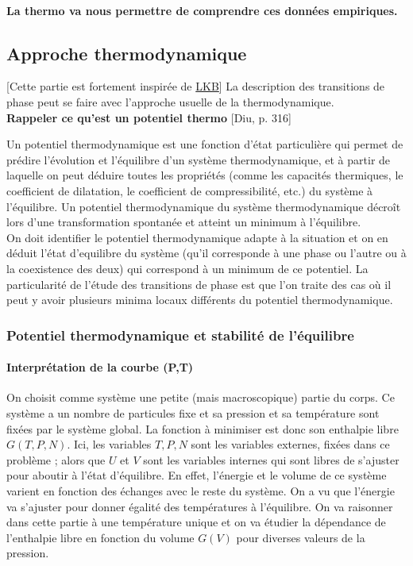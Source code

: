 \documentclass[11pt]{report}
\numberwithin{figure}{section}
\numberwithin{equation}{section}
\numberwithin{table}{section}
\newcommand{\1}{\boldsymbol{1}}
\begin{document}
\paragraph{La thermo va nous permettre de comprendre ces données empiriques.}


\subsection{Approche thermodynamique}


[Cette partie est fortement inspirée de \href{https://www.lkb.upmc.fr/boseeinsteincondensates/wp-content/uploads/sites/10/2017/10/CoursThermo2017.pdf}{LKB}] La description des transitions de phase peut se faire avec l’approche usuelle
de la thermodynamique. \\

\textbf{Rappeler ce qu'est un potentiel thermo} [Diu, p. 316]


Un potentiel thermodynamique est une fonction d'état particulière qui permet de prédire l'évolution et l'équilibre d'un système thermodynamique, et à partir de laquelle on peut déduire toutes les propriétés (comme les capacités thermiques, le coefficient de dilatation, le coefficient de compressibilité, etc.) du système à l'équilibre. Un potentiel thermodynamique du système thermodynamique décroît lors d'une transformation spontanée et atteint un minimum à l'équilibre. \\

On doit identifier le potentiel thermodynamique adapte à la situation et on en déduit l’état d’equilibre du système (qu’il corresponde à une phase ou l’autre ou à la coexistence des deux) qui correspond à un minimum de ce potentiel. La particularité de l’étude des transitions de phase est que l’on traite des cas où il peut y avoir plusieurs minima locaux différents du potentiel thermodynamique.

\subsubsection{Potentiel thermodynamique et stabilité de l'équilibre}

\paragraph{Interprétation de la courbe (P,T)}

On choisit comme système une petite (mais macroscopique) partie du corps.
Ce système a un nombre de particules fixe et sa pression et sa température sont
fixées par le système global. La fonction à minimiser est donc son enthalpie libre
$G(T,P,N)$. Ici, les variables $T, P, N$ sont les variables externes, fixées
dans ce problème ; alors que $U$ et $V$ sont les variables internes qui sont libres
de s’ajuster pour aboutir à l’état d’équilibre. En effet, l’énergie et le volume de ce système varient en fonction des échanges avec le reste du système. On a
vu que l’énergie va s’ajuster pour donner égalité des températures à l’équilibre.
On va raisonner dans cette partie à une température unique et on va étudier
la dépendance de l’enthalpie libre en fonction du volume $G(V)$ pour diverses
valeurs de la pression.
\end{document}
